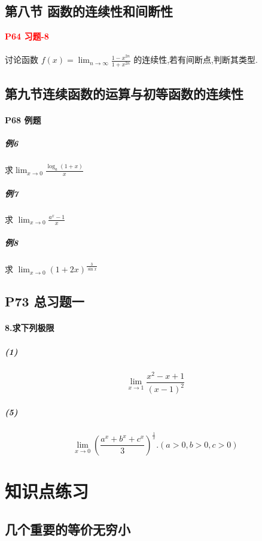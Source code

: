 \documentclass[a4paper]{article}
\begin{document}
\subsection{第八节 \quad  函数的连续性和间断性}
\textcolor{red}{\textbf{P64 \quad 习题-8}}
\paragraph{}
讨论函数 $f(x) = \lim_{n \rightarrow \infty} { \frac{1 - x^{2n}} {1 + x^{2n}} }$ 的连续性,若有间断点,判断其类型.

\subsection{第九节\quad 连续函数的运算与初等函数的连续性}
\paragraph{P68 \quad 例题}
\subparagraph{例6}
求$\lim_{x \rightarrow 0}
     {
         \frac{
             \log_{a}{(1+x)}
            }{x}
     }$

\subparagraph{例7}
求 $\lim_{x \rightarrow 0}
     {
         \frac{a^x - 1}{x}
     }$

\subparagraph{例8}
求 $\lim_{x \rightarrow 0}
     {
         (1 + 2x)^{\frac{3}{\sin{x}}}
     }$


\subsection{P73 总习题一}
\paragraph{8.求下列极限}
\subparagraph{(1)}
$$
\lim_{x \rightarrow 1}
     {
         \frac{x^2 - x + 1}
              {(x-1)^2}
         }
$$

\subparagraph{(5)}
$$
\lim_{x \rightarrow 0}
     {
         (
            \frac{a^x + b^x + c^x}
                 {3}
         )^ {\frac{1}{x}}
     }.
     (a>0,b>0,c>0)
$$

\newpage
\section{知识点练习}
\subsection{几个重要的等价无穷小}
\end{document}
